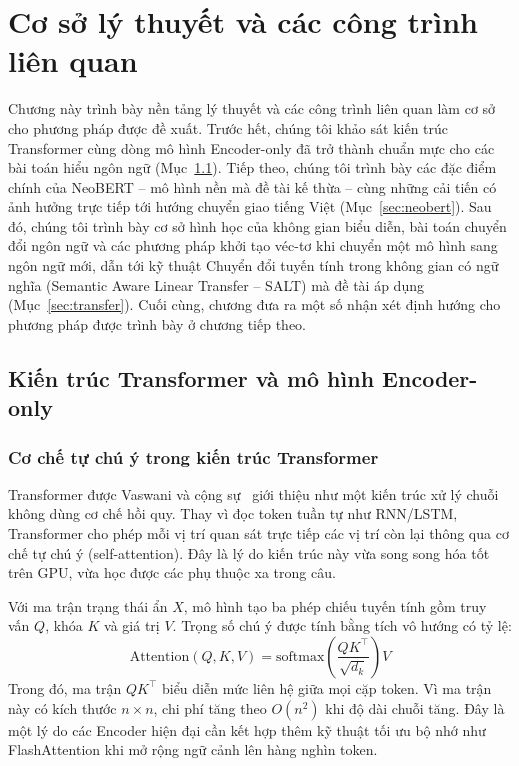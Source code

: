 \chapter{Cơ sở lý thuyết và các công trình liên quan}
\label{chap:related}

Chương này trình bày nền tảng lý thuyết và các công trình liên quan làm cơ sở cho
phương pháp được đề xuất. Trước hết, chúng tôi khảo sát kiến trúc Transformer cùng dòng
mô hình Encoder-only đã trở thành chuẩn mực cho các bài toán hiểu ngôn ngữ
(Mục~\ref{sec:transformer}). Tiếp theo, chúng tôi trình bày các đặc điểm chính của NeoBERT
-- mô hình nền mà đề tài kế thừa -- cùng những cải tiến có ảnh hưởng trực tiếp tới hướng
chuyển giao tiếng Việt (Mục~\ref{sec:neobert}). Sau đó, chúng tôi trình bày cơ sở hình học
của không gian biểu diễn, bài toán chuyển đổi ngôn ngữ và các phương pháp khởi tạo véc-tơ
khi chuyển một mô hình sang ngôn ngữ mới, dẫn tới kỹ thuật Chuyển đổi tuyến tính trong không gian có ngữ nghĩa (Semantic Aware Linear Transfer -- SALT) mà đề tài áp dụng
(Mục~\ref{sec:transfer}). Cuối cùng, chương đưa ra một số nhận xét định hướng cho phương pháp
được trình bày ở chương tiếp theo.

\section{Kiến trúc Transformer và mô hình Encoder-only}
\label{sec:transformer}

\subsection{Cơ chế tự chú ý trong kiến trúc Transformer}
\label{subsec:attention}

Transformer được Vaswani và cộng sự~\cite{vaswani2017attention} giới thiệu như một kiến
trúc xử lý chuỗi không dùng cơ chế hồi quy. Thay vì đọc token tuần tự như RNN/LSTM, Transformer
cho phép mỗi vị trí quan sát trực tiếp các vị trí còn lại thông qua cơ chế tự chú ý
(self-attention). Đây là lý do kiến trúc này vừa song song hóa tốt trên GPU, vừa học được
các phụ thuộc xa trong câu.

Với ma trận trạng thái ẩn $X$, mô hình tạo ba phép chiếu tuyến tính gồm truy vấn $Q$, khóa
$K$ và giá trị $V$. Trọng số chú ý được tính bằng tích vô hướng có tỷ lệ:
\begin{equation}
  \label{eq:attention}
  \mathrm{Attention}(Q, K, V) = \mathrm{softmax}\!\left(\frac{QK^\top}{\sqrt{d_k}}\right) V
\end{equation}
Trong đó, ma trận $QK^\top$ biểu diễn mức liên hệ giữa mọi cặp token. Vì ma trận này có
kích thước $n \times n$, chi phí tăng theo $O(n^2)$ khi độ dài chuỗi tăng. Đây là một
lý do các Encoder hiện đại cần kết hợp thêm kỹ thuật tối ưu bộ nhớ như FlashAttention khi
mở rộng ngữ cảnh lên hàng nghìn token.

